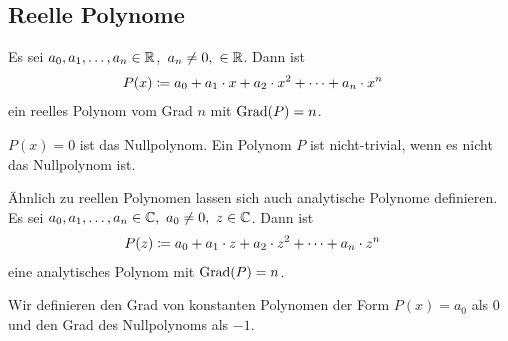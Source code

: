 \subsection{Reelle Polynome}
\thispagestyle{pagenumberonly}

\begin{definition}
    Es sei $a_0,a_1, \dots, a_n\in\mathbb{R}$,~$a_n \neq 0,~\in\mathbb{R}$. Dann ist
    \begin{align*}
        P(x) &\coloneqq a_0 + a_1 \cdot x + a_2 \cdot x^2 + \dots + a_n \cdot x^n
    \end{align*}
    ein reelles Polynom vom Grad $n$ mit $\operatorname{Grad}(P) = n$.
\end{definition}

\begin{definition}[Nullpolynom]
    $P(x) = 0$ ist das Nullpolynom. Ein Polynom $P$ ist nicht-trivial, wenn es nicht das Nullpolynom ist.
\end{definition}

\begin{bemerkung}
    Ähnlich zu reellen Polynomen lassen sich auch analytische Polynome definieren. Es sei $a_0, a_1, \dots, a_n \in\mathbb{C},~a_0\neq 0,~z\in\mathbb{C}$. Dann ist
    \begin{align*}
        P(z) &\coloneqq a_0 + a_1\cdot z + a_2\cdot z^2 + \dots + a_n\cdot z^n
    \end{align*}
    eine analytisches Polynom mit $\operatorname{Grad}(P) = n$.
\end{bemerkung}

\begin{definition}
    Wir definieren den Grad von konstanten Polynomen der Form $P(x) = a_0$ als 0 und den Grad des Nullpolynoms als $-1$.
\end{definition}


